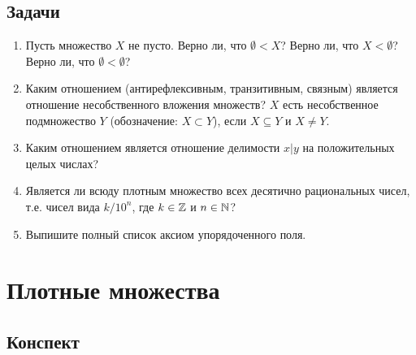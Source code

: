 \subsection*{Задачи}

\begin{enumerate}
\item Пусть множество $X$ не пусто. Верно ли, что $\emptyset<X$? Верно ли, что $X<\emptyset$? Верно ли, что $\emptyset<\emptyset$?
\item Каким отношением (антирефлексивным, транзитивным, связным) является отношение несобственного вложения множеств? $X$ есть несобственное подмножество $Y$ (обозначение: $X\subset Y$), если $X\subseteq Y$ и $X\ne Y$.
\item Каким отношением является отношение делимости $x|y$ на положительных целых числах?
\item Является ли всюду плотным множество всех десятично рациональных чисел, т.е. чисел вида $k/10^n$, где $k\in \mathbb Z$ и $n\in\mathbb N$?
\item Выпишите полный список аксиом упорядоченного поля.
\end{enumerate}


\section{Плотные множества}

\subsection*{Конспект}

